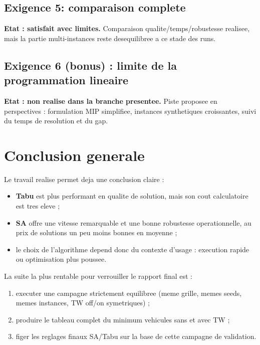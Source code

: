 \documentclass[12pt,a4paper]{report}
\begin{document}
\section{Exigence 5: comparaison complete}
\textbf{Etat : satisfait avec limites.}
Comparaison qualite/temps/robustesse realisee,
mais la partie multi-instances reste desequilibree a ce stade des runs.

\section{Exigence 6 (bonus) : limite de la programmation lineaire}
\textbf{Etat : non realise dans la branche presentee.}
Piste proposee en perspectives : formulation MIP simplifiee,
instances synthetiques croissantes, suivi du temps de resolution et du gap.

\chapter{Conclusion generale}
Le travail realise permet deja une conclusion claire :
\begin{itemize}[leftmargin=1.2cm]
  \item \textbf{Tabu} est plus performant en qualite de solution,
  mais son cout calculatoire est tres eleve ;
  \item \textbf{SA} offre une vitesse remarquable et une bonne robustesse operationnelle,
  au prix de solutions un peu moins bonnes en moyenne ;
  \item le choix de l'algorithme depend donc du contexte d'usage :
  execution rapide ou optimisation plus poussee.
\end{itemize}

La suite la plus rentable pour verrouiller le rapport final est :
\begin{enumerate}
  \item executer une campagne strictement equilibree (meme grille, memes seeds, memes instances,
  TW off/on symetriques) ;
  \item produire le tableau complet du minimum vehicules sans et avec TW ;
  \item figer les reglages finaux SA/Tabu sur la base de cette campagne de validation.
\end{enumerate}
\end{document}
